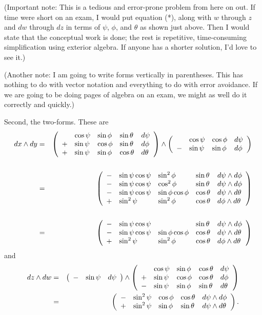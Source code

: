 \documentclass[10pt]{article}
\numberwithin{equation}{subsection}
\begin{document}
(Important note:  This is a tedious and error-prone problem from here on out.
If time were short on an exam, I would put equation (*), along with $w$ through
$z$ and $dw$ through $dz$ in terms of $\psi$, $\phi$, and $\theta$ as shown
just above.  Then I would state that the conceptual work is done; the rest is
repetitive, time-consuming simplification using exterior algebra.  If anyone
has a shorter solution, I'd love to see it.)

(Another note:  I am going to write forms vertically in parentheses.  This has
nothing to do with vector notation and everything to do with error avoidance.
If we are going to be doing pages of algebra on an exam, we might as well do it
correctly and quickly.)

Second, the two-forms.  These are
\begin{eqnarray*}
	dx\wedge dy &=&
	\plmatrix{
		&  \cos\psi & \sin\phi & \sin\theta & d\psi \\
		+& \sin\psi & \cos\phi & \sin\theta & d\phi \\
		+& \sin\psi & \sin\phi & \cos\theta & d\theta
	}
	\wedge
	\plmatrix{
		&  \cos\psi & \cos\phi & d\psi \\
		-& \sin\psi & \sin\phi & d\phi
	}
	\\
%
	&&\\
%
	&=&\plmatrix{
		-& \sin\psi \cos\psi &\sin^2\phi       &\sin\theta &d\psi\wedge d\phi \\
		-& \sin\psi \cos\psi &\cos^2\phi       &\sin\theta &d\psi \wedge d\phi\\
		-& \sin\psi \cos\psi &\sin\phi\cos\phi &\cos\theta &d\psi\wedge d\theta \\
		+& \sin^2\psi        &\sin^2\phi       &\cos\theta &d\phi\wedge d\theta
	} \\
%
	&&\\
%
	&=&\plmatrix{
		-& \sin\psi \cos\psi &                 &\sin\theta &d\psi \wedge d\phi \\
		-& \sin\psi \cos\psi &\sin\phi\cos\phi &\cos\theta &d\psi\wedge d\theta \\
		+& \sin^2\psi        &\sin^2\phi       &\cos\theta &d\phi\wedge d\theta
	}
\end{eqnarray*}
and
\begin{eqnarray*}
	dz\wedge dw
	&=& \left(\begin{array}{llllllllllll} 
			-& \sin\psi &d\psi
		 \end{array}\right)
		\wedge
		\left(\begin{array}{llllllllllll} 
			&  \cos\psi & \sin\phi & \cos\theta &d\psi \\
			+& \sin\psi & \cos\phi & \cos\theta &d\phi \\
			-& \sin\psi & \sin\phi & \sin\theta &d\theta
		 \end{array}\right) \\
	&=& \left(\begin{array}{llllllllllll} 
		-& \sin^2\psi & \cos\phi & \cos\theta &d\psi \wedge d\phi \\
		+& \sin^2\psi & \sin\phi & \sin\theta &d\psi \wedge d\theta
		 \end{array}\right).
\end{eqnarray*}
\end{document}
